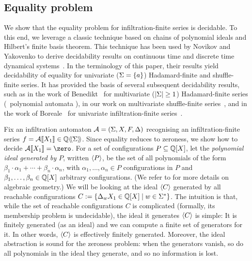 \subsection{Equality problem}
\label{sec:infiltration:equality}

We show that the equality problem for infiltration-finite series is decidable.
%
%
To this end, we leverage a classic technique based on chains of polynomial ideals and Hilbert's finite basis theorem.
%
This technique has been used by Novikov and Yakovenko to derive decidability results
on continuous time and discrete time dynamical systems~\cite{NovikovYakovenko:1999}.
%
In the terminology of this paper,
their results yield decidability of equality for univariate ($\Sigma = \left\{a\right\}$) Hadamard-finite and shuffle-finite series.
%
It has provided the basis of several subsequent decidability results,
such as in the work of Benedikt \etal~for multivariate ($\left|\Sigma\right| \geq 1$) Hadamard-finite series
(\aka~polynomial automata \cite{BenediktDuffSharadWorrell:PolyAut:LICS:2017}),
in our work on multivariate shuffle-finite series~\cite{Clemente:CONCUR:2024},
and in the work of Boreale \etal~for univariate infiltration-finite series~\cite{BorealeGorla:CONCUR:2021,BorealeCollodiGorla:ACMTCL:2024}.

Fix an infiltration automaton $\mathcal A = (\Sigma, X, F, \Delta)$
recognising an infiltration-finite series $f = \mathcal A\llbracket X_1\rrbracket \in \mathbb Q\langle\!\langle\Sigma\rangle\!\rangle$.
%
Since equality reduces to zeroness, we show how to decide $\Asem \AA {X_1} = \zero$.
%
For a set of configurations $P \subseteq \mathbb Q[X]$,
let the \emph{polynomial ideal generated by $P$}, written $\langle P\rangle$,
be the set of all polynomials of the form $\beta_1 \cdot \alpha_1 + \cdots + \beta_n \cdot \alpha_n$,
with $\alpha_1, \dots, \alpha_n \in P$ configurations in $P$
and $\beta_1, \dots, \beta_n \in \mathbb Q[X]$ arbitrary configurations.
%
(We refer to \cite{CoxLittleOShea:Ideals:2015} for more details on algebraic geometry.)
%
We will be looking at the ideal $\langle C\rangle$ generated by all reachable configurations
$C := \left\{\Delta_w X_1 \in \mathbb Q[X] \;\middle|\; w \in \Sigma^*\right\}$.
%
The intuition is that, while the set of reachable configurations $C$ is complicated
(formally, its membership problem is undecidable),
the ideal it generates $\langle C\rangle$ is simple:
It is finitely generated (as an ideal)
and we can compute a finite set of generators for it.
%
In other words, $\langle C\rangle$ is effectively finitely generated.
%
Moreover, the ideal abstraction is sound for the zeroness problem:
when the generators vanish, so do all polynomials in the ideal they generate,
and so no information is lost.

